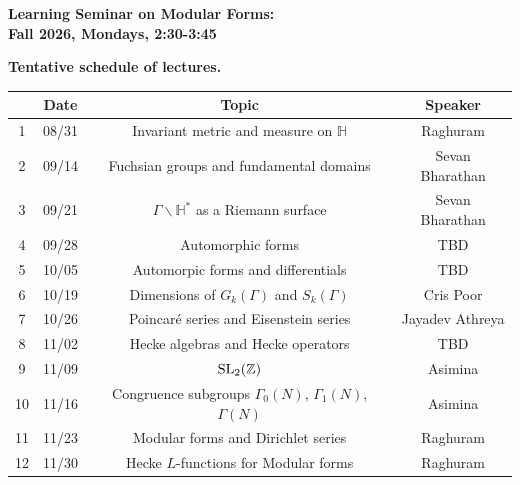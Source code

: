 \documentclass[12pt]{article}
\begin{document}
\begin{center}
 {\bf {\large Learning Seminar on Modular Forms: \\
 Fall 2026, Mondays, 2:30-3:45}}\\
\end{center}

\bigskip

\begin{center}
{\bf Tentative schedule of lectures.} 
\end{center}

\bigskip

{\Large
\begin{center} \begin{tabular}{|c |c | c | c |}\hline
&  Date & Topic & Speaker \\\hline\hline
1 & 08/31 &  Invariant metric and measure on $\mathbb{H}$ & Raghuram\\\hline
2 & 09/14 &  Fuchsian groups and fundamental domains & Sevan Bharathan\\\hline
3 & 09/21 &  $\Gamma \backslash \mathbb{H}^*$ as a Riemann surface & Sevan Bharathan \\\hline
4 & 09/28 &  Automorphic forms & TBD \\\hline
5 & 10/05 &  Automorpic forms and differentials &  TBD \\\hline
6 & 10/19 &  Dimensions of $G_k(\Gamma)$ and $S_k(\Gamma)$ & Cris Poor \\\hline 
7 & 10/26 & Poincar\'e series and Eisenstein series & Jayadev Athreya \\\hline 
8 & 11/02 &  Hecke algebras and Hecke operators & TBD \\\hline  
9 & 11/09 & ${\rm SL}_2(\mathbb{Z})$ & Asimina \\\hline
10 & 11/16 & Congruence subgroups $\Gamma_0(N)$, $\Gamma_1(N)$, $\Gamma(N)$ &  Asimina \\\hline
11 & 11/23 & Modular forms and Dirichlet series & Raghuram \\\hline
12 & 11/30 & Hecke $L$-functions for Modular forms & Raghuram \\\hline
\end{tabular}
\end{center}}
 
\end{document}
